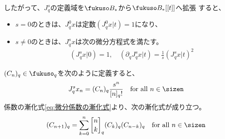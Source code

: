 {	したがって、$J_q^s$の定義域を$\fukuso B_*$から$\fukuso B_*[[t]]$へ拡張
	すると、
	\begin{itemize}\setlength{\itemsep}{-1mm} %
		\item $s=0$のときは、$J_q^0x$は定数$(J_q^0x|t)=1$になり、
		\item $s\neq0$のときは、$J_q^sx$は次の微分方程式を満たす。
		\begin{equation*}\begin{split}
			(J_q^sx|0) = 1,\quad (\partial_qJ_q^sx|t) = \frac{1}{s}(J_q^sx|t)^2
		\end{split}\end{equation*}
	\end{itemize} %
	$(C_n)_q\in\fukuso_q$を次のように定義すると、
	\begin{equation*}\begin{split}
		J^s_qx_n = (C_n)_q\frac{s^n}{[n]_q!}
		\quad\text{for all } n\in\sizen
	\end{split}\end{equation*}
	係数の漸化式\eqref{eq:微分係数の漸化式}より、次の漸化式が成り立つ。
	\begin{equation}\label{eq:微分係数の漸化式その二}\begin{split}
		(C_{n+1})_q = \sum_{k=0}^n \qbinom{n}{k}_q(C_{k})_q(C_{n-k})_q
			\quad\text{for all } n\in\sizen
	\end{split}\end{equation}

}
